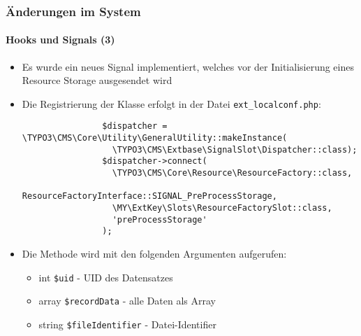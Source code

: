 \begin{frame}[fragile]
	\frametitle{Änderungen im System}
	\framesubtitle{Hooks und Signals (3)}

	\lstset{basicstyle=\tiny\ttfamily}

	\begin{itemize}

		\item Es wurde ein neues Signal implementiert, welches vor der Initialisierung eines Resource Storage ausgesendet wird

		\item Die Registrierung der Klasse erfolgt in der Datei \texttt{ext\_localconf.php}:

			\begin{lstlisting}
				$dispatcher = \TYPO3\CMS\Core\Utility\GeneralUtility::makeInstance(
				  \TYPO3\CMS\Extbase\SignalSlot\Dispatcher::class);
				$dispatcher->connect(
				  \TYPO3\CMS\Core\Resource\ResourceFactory::class,
				  ResourceFactoryInterface::SIGNAL_PreProcessStorage,
				  \MY\ExtKey\Slots\ResourceFactorySlot::class,
				  'preProcessStorage'
				);
			\end{lstlisting}

		\item Die Methode wird mit den folgenden Argumenten aufgerufen:

			\begin{itemize}
				\item int \texttt{\$uid} - UID des Datensatzes
				\item array \texttt{\$recordData} - alle Daten als Array
				\item string \texttt{\$fileIdentifier} - Datei-Identifier
			\end{itemize}

	\end{itemize}

\end{frame}


